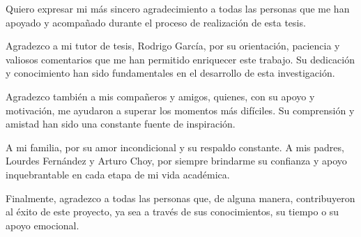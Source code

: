 \begin{acknowledgements}

Quiero expresar mi más sincero agradecimiento a todas las personas que me han apoyado y acompañado durante el proceso de realización de esta tesis.

Agradezco a mi tutor de tesis, Rodrigo García, por su orientación, paciencia y valiosos comentarios que me han permitido enriquecer este trabajo. Su dedicación y conocimiento han sido fundamentales en el desarrollo de esta investigación.

Agradezco también a mis compañeros y amigos, quienes, con su apoyo y motivación, me ayudaron a superar los momentos más difíciles. Su comprensión y amistad han sido una constante fuente de inspiración.

A mi familia, por su amor incondicional y su respaldo constante. A mis padres, Lourdes Fernández y Arturo Choy, por siempre brindarme su confianza y apoyo inquebrantable en cada etapa de mi vida académica.

Finalmente, agradezco a todas las personas que, de alguna manera, contribuyeron al éxito de este proyecto, ya sea a través de sus conocimientos, su tiempo o su apoyo emocional.


\end{acknowledgements}